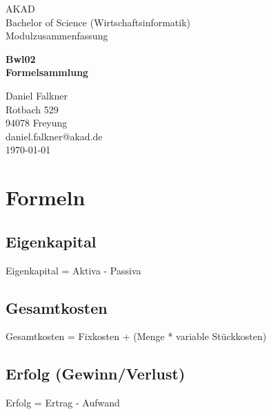 \documentclass[a4paper,12pt]{scrartcl}
\begin{document}
\begin{titlepage}
\begin{small}
\vfill {AKAD\\ 
Bachelor of Science (Wirtschaftsinformatik) \\ 
Modulzusammenfassung}
\end{small}


\begin{center}
\begin{Large}
\vfill {\textsf{\textbf{
Bwl02 \\
\vspace*{1cm} 
Formelsammlung
}}}
\end{Large}
\end{center}

\begin{small}
\vfill Daniel Falkner \\ Rotbach 529 \\  94078 Freyung \\  daniel.falkner@akad.de \\ 
\today
\end{small}

\end{titlepage}


\tableofcontents
\thispagestyle{empty}

\clearpage

\onehalfspacing

\pagestyle{plain}


\section{Formeln}

\subsection{Eigenkapital}
Eigenkapital = Aktiva - Passiva
\subsection{Gesamtkosten}
Gesamtkosten = Fixkosten + (Menge * variable Stückkosten)
\subsection{Erfolg (Gewinn/Verlust)}
Erfolg = Ertrag - Aufwand
\end{document}
